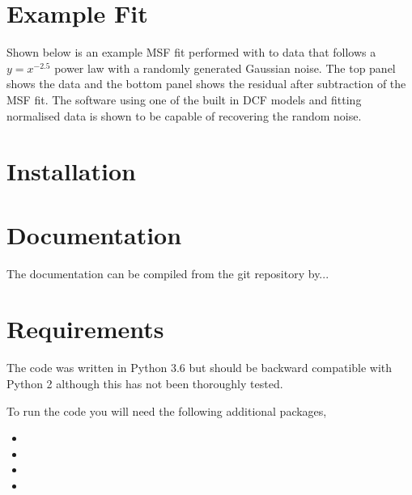 \documentclass[letterpaper,10pt,english]{sphinxmanual}
\let\sphinxpxdimen\pdfpxdimen\else\newdimen\sphinxpxdimen
\begin{document}
\section{Example Fit}
\label{\detokenize{source/intro:example-fit}}
Shown below is an example MSF fit performed with  to data that
follows a \({y = x^{-2.5}}\) power law with a randomly generated Gaussian
noise. The top panel shows the data and the bottom panel shows the residual
after subtraction of the MSF fit. The software using one of the built in DCF models
and fitting normalised data is shown to be capable of recovering the
random noise.

\noindent{\hspace*{\fill}\sphinxincludegraphics[width=400\sphinxpxdimen]{{README}.png}\hspace*{\fill}}


\section{Installation}
\label{\detokenize{source/intro:installation}}

\section{Documentation}
\label{\detokenize{source/intro:documentation}}
The documentation can be compiled from the git repository by...


\section{Requirements}
\label{\detokenize{source/intro:requirements}}
The code was written in Python 3.6 but should be backward compatible with
Python 2 although this has not been thoroughly tested.

To run the code you will need the following additional packages,
\begin{itemize}
\item {} 

\item {} 

\item {} 

\item {} 

\end{itemize}
\end{document}
